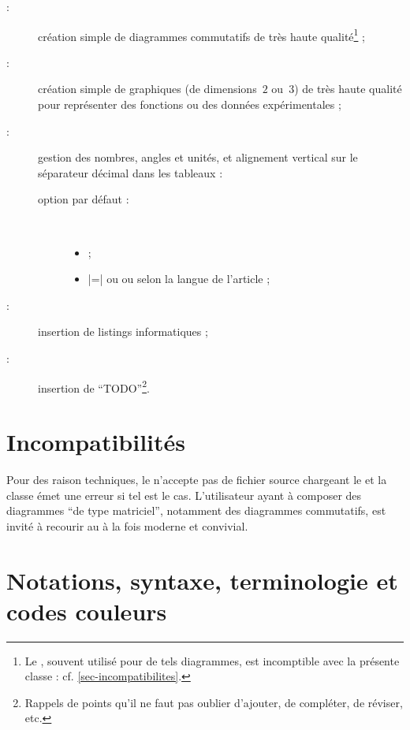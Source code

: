 \documentclass[french,nolocaltoc]{nwejmart}
\newtheorem[style=definition]{fait}
\newtheorem[title=expérience]{experience}
\newtheorem[title-plural=anneaux]{anneau}
\newtheorem[title=idéal,title-plural=idéaux]{ideal}
\begin{document}
\begin{description}
\item[ :] création simple de diagrammes commutatifs de très
  haute qualité\footnote{Le , souvent utilisé pour de tels
    diagrammes, est incomptible avec la présente classe :
    cf. \vref{sec-incompatibilites}.} ;
\item[ :] création simple de graphiques (de dimensions~$2$
  ou~$3$) de très haute qualité pour représenter des fonctions ou des données
  expérimentales ;
\item[ :] gestion des nombres, angles et unités, et alignement
  vertical sur le séparateur décimal dans les tableaux :
  \begin{description}
  \item[option par défaut :]\
    \begin{itemize}
    \item {} ;
    \item {}|=| ou  ou 
      selon la langue de l'article ;
    \end{itemize}
  \end{description}
\item[ :] insertion de listings informatiques ;
\item[\package{todonotes} :] insertion de \enquote{TODO}\footnote{Rappels de
    points qu'il ne faut pas oublier d'ajouter, de compléter, de réviser, etc.}.
\end{description}

\section{Incompatibilités}
\label{sec-incompatibilites}

Pour des raison techniques, le \nwejm{} n'accepte pas de fichier source
\file{.tex} chargeant le \Package{xy} et la classe \nwejmauthor{} émet une
erreur si tel est le cas. L'utilisateur ayant à composer des diagrammes
\enquote{de type matriciel}, notamment des diagrammes commutatifs, est invité
à recourir au \Package{tikz-cd} à la fois moderne et convivial.

\section{Notations, syntaxe, terminologie et codes couleurs}\label{sec-synt-term-notat}
\end{document}
